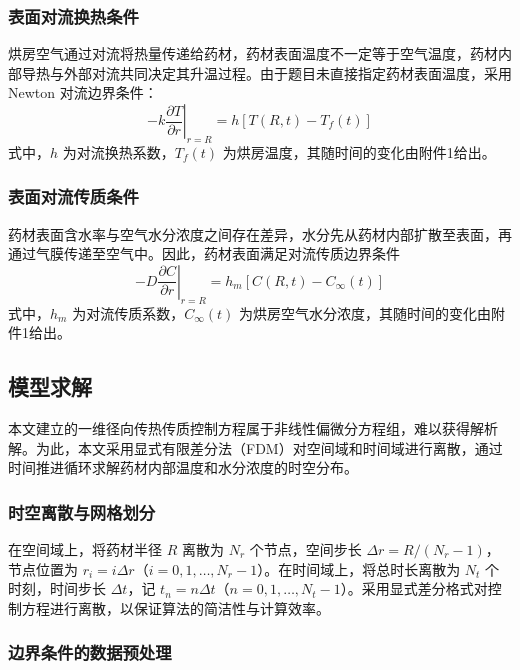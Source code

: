 \documentclass[withoutpreface,bwprint]{cumcm_thesis}
\begin{document}
\subsubsection{表面对流换热条件}

烘房空气通过对流将热量传递给药材，药材表面温度不一定等于空气温度，药材内部导热与外部对流共同决定其升温过程。由于题目未直接指定药材表面温度，采用 Newton 对流边界条件：
\begin{equation}
-k \left. \frac{\partial T}{\partial r} \right|_{r=R} = h \left[ T(R,t) - T_f(t) \right]
\end{equation}
式中，\(h\) 为对流换热系数，\(T_f(t)\) 为烘房温度，其随时间的变化由附件1给出。

\subsubsection{表面对流传质条件}

药材表面含水率与空气水分浓度之间存在差异，水分先从药材内部扩散至表面，再通过气膜传递至空气中。因此，药材表面满足对流传质边界条件
\begin{equation}
-D \left. \frac{\partial C}{\partial r} \right|_{r=R} = h_m \left[ C(R,t) - C_\infty(t) \right]
\end{equation}
式中，\(h_m\) 为对流传质系数，\(C_\infty(t)\) 为烘房空气水分浓度，其随时间的变化由附件1给出。

\subsection{模型求解}

本文建立的一维径向传热传质控制方程属于非线性偏微分方程组，难以获得解析解。为此，本文采用显式有限差分法（FDM）对空间域和时间域进行离散，通过时间推进循环求解药材内部温度和水分浓度的时空分布。

\subsubsection{时空离散与网格划分}

在空间域上，将药材半径 \(R\) 离散为 \(N_r\) 个节点，空间步长 \(\Delta r = R/(N_r-1)\)，节点位置为 \(r_i = i\Delta r\)（\(i = 0,1,\dots,N_r-1\)）。在时间域上，将总时长离散为 \(N_t\) 个时刻，时间步长 \(\Delta t\)，记 \(t_n = n\Delta t\)（\(n = 0,1,\dots,N_t-1\)）。采用显式差分格式对控制方程进行离散，以保证算法的简洁性与计算效率。

\subsubsection{边界条件的数据预处理}
\end{document}
